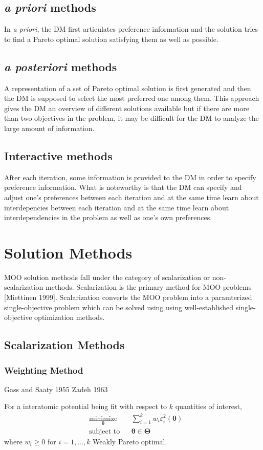 \subsection{\emph{a priori} methods}
In \emph{a priori}, the DM first articulates preference information and the solution tries to find a Pareto optimal solution satisfying them as well as possible.

\subsection{\emph{a posteriori} methods}
A representation of a set of Pareto optimal solution is first generated and then the DM is supposed to select the most preferred one among them.  This approach gives the DM an overview of different solutions available but if there are more than two objectives in the problem, it may be difficult for the DM to analyze the large amount of information.

\subsection{Interactive methods}
After each iteration, some information is provided to the DM in order to specify preference information.  What is noteworthy is that the DM can specify and adjust one's preferences between each iteration and at the same time learn about interdepencies between each iteration and at the same time learn about interdependencies in the problem as well as one's own preferences.


\section{Solution Methods}
MOO solution methods fall under the category of scalarization or non-scalarization methods.  Scalarization is the primary method for MOO problems [Miettinen 1999].  Scalarization converts the MOO problem into a paramterized single-objective problem which can be solved using using well-established single-objective optimization methods.
\subsection{Scalarization Methods}
\subsubsection{Weighting Method}
Gass and Saaty 1955
Zadeh 1963

For a interatomic potential being fit with respect to $k$ quantities of interest,
\begin{equation}
  \begin{aligned}
  & \underset{\bm{\theta}}{\text{minimize}}
        & & \sum_{i=1}^{k}w_{i} \varepsilon_i^2(\bm{\theta}) \\
  & \text{subject to}
        & & \bm{\theta} \in \bm{\Theta}
  \end{aligned}
\end{equation}
where $w_i \geq 0$ for $i=1,...,k$
Weakly Pareto optimal.

